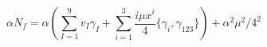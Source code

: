 \begin{equation}
\alpha N_f=\alpha (\sum_{I=1}^9 v_I \gamma_I + \sum_{i=1}^3\frac{i\mu 
x^i}{4} \{\gamma_i, \gamma_{123}\})+\alpha^2 \mu^2/4^2 
\end{equation}

